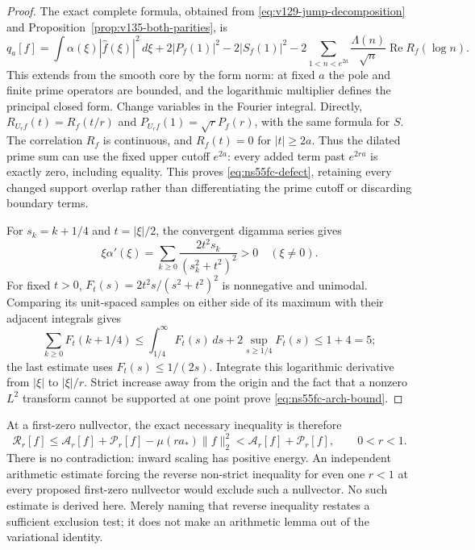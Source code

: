 \documentclass[11pt]{article}
\theoremstyle{remark}
\begin{document}
\begin{proof}
The exact complete formula, obtained from
\eqref{eq:v129-jump-decomposition} and
Proposition~\ref{prop:v135-both-parities}, is
\[
 q_a[f]=\int\alpha(\xi)|\widehat f(\xi)|^2\,d\xi
  +2|P_f(1)|^2-2|S_f(1)|^2
  -2\sum_{1<n<e^{2a}}\frac{\Lambda(n)}{\sqrt n}
                        \operatorname{Re}R_f(\log n).
\]
This extends from the smooth core by the form norm: at fixed $a$
the pole and finite prime operators are bounded, and the logarithmic
multiplier defines the principal closed form. Change variables in
the Fourier integral. Directly,
$R_{U_rf}(t)=R_f(t/r)$ and
$P_{U_rf}(1)=\sqrt r P_f(r)$, with the same formula for $S$.
The correlation $R_f$ is continuous, and $R_f(t)=0$ for
$|t|\ge2a$. Thus the dilated prime sum can use the fixed upper
cutoff $e^{2a}$: every added term past $e^{2ra}$ is exactly zero,
including equality. This proves \eqref{eq:ns55fc-defect}, retaining
every changed support overlap rather than differentiating the prime
cutoff or discarding boundary terms.

For $s_k=k+1/4$ and $t=|\xi|/2$, the convergent digamma series gives
\[
 \xi\alpha'(\xi)
 =\sum_{k\ge0}\frac{2t^2s_k}{(s_k^2+t^2)^2}>0\quad(\xi\ne0).
\]
For fixed $t>0$, $F_t(s)=2t^2s/(s^2+t^2)^2$ is nonnegative and
unimodal. Comparing its unit-spaced samples on either side of its
maximum with their adjacent integrals gives
\[
 \sum_{k\ge0}F_t(k+1/4)
 \le\int_{1/4}^\infty F_t(s)\,ds
               +2\sup_{s\ge1/4}F_t(s)\le1+4=5;
\]
the last estimate uses $F_t(s)\le1/(2s)$. Integrate this logarithmic
derivative from $|\xi|$ to $|\xi|/r$. Strict increase away from the
origin and the fact that a nonzero $L^2$ transform cannot be supported
at one point prove \eqref{eq:ns55fc-arch-bound}.
\end{proof}

At a first-zero nullvector, the exact necessary inequality is therefore
\begin{equation}\label{eq:ns55fc-necessary}
 \mathcal R_r[f]
 \le\mathcal A_r[f]+\mathcal P_r[f]
             -\mu(ra_*)\|f\|_2^2
 <\mathcal A_r[f]+\mathcal P_r[f],\qquad 0<r<1.
\end{equation}
There is no contradiction: inward scaling has positive energy.
An independent arithmetic estimate forcing the reverse non-strict
inequality for even one $r<1$ at every proposed first-zero nullvector
would exclude such a nullvector. No such estimate is derived here.
Merely naming that reverse inequality restates a sufficient exclusion
test; it does not make an arithmetic lemma out of the variational identity.
\end{document}
